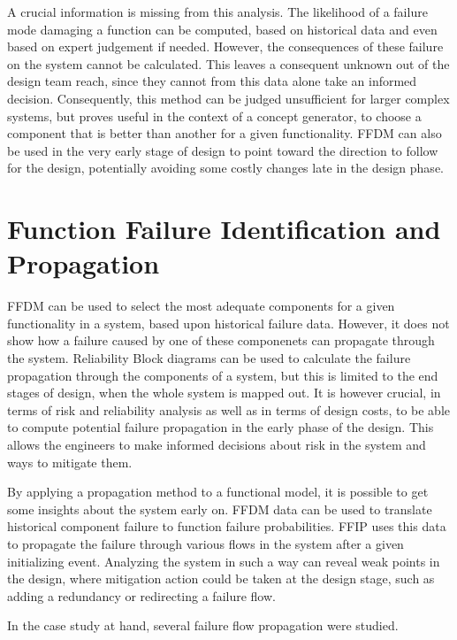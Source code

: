 A crucial information is missing from this analysis. The likelihood of a failure mode damaging a function can be computed, based on historical data and even based on expert judgement if needed. However, the consequences of these failure on the system cannot be calculated. This leaves a consequent unknown out of the design team reach, since they cannot from this data alone take an informed decision. Consequently, this method can be judged unsufficient for larger complex systems, but proves useful in the context of a concept generator, to choose a component that is better than another for a given functionality. FFDM can also be used in the very early stage of design to point toward the direction to follow for the design, potentially avoiding some costly changes late in the design phase.

\section{Function Failure Identification and Propagation}

FFDM can be used to select the most adequate components for a given functionality in a system, based upon historical failure data. However, it does not show how a failure caused by one of these componenets can propagate through the system. Reliability Block diagrams can be used to calculate the failure propagation through the components of a system, but this is limited to the end stages of design, when the whole system is mapped out. It is however crucial, in terms of risk and reliability analysis as well as in terms of design costs, to be able to compute potential failure propagation in the early phase of the design. This allows the engineers to make informed decisions about risk in the system and ways to mitigate them.

By applying a propagation method to a functional model, it is possible to get some insights about the system early on. FFDM data can be used to translate historical component failure to function failure probabilities. FFIP uses this data to propagate the failure through various flows in the system after a given initializing event. Analyzing the system in such a way can reveal weak points in the design, where mitigation action could be taken at the design stage, such as adding a redundancy or redirecting a failure flow.

In the case study at hand, several failure flow propagation were studied.
